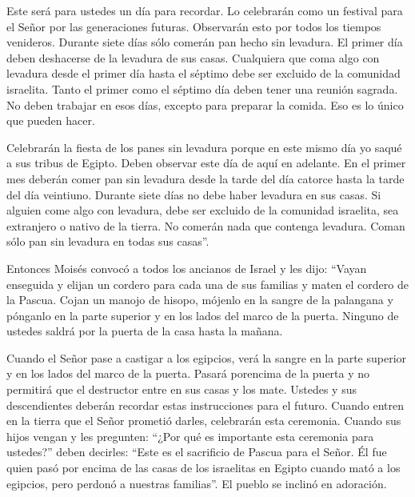  Este será para ustedes un día para recordar. Lo celebrarán
como un festival para el Señor por las generaciones futuras. Observarán
esto por todos los tiempos venideros.  Durante siete días
sólo comerán pan hecho sin levadura. El primer día deben deshacerse de
la levadura de sus casas. Cualquiera que coma algo con levadura desde el
primer día hasta el séptimo debe ser excluido de la comunidad israelita.
 Tanto el primer como el séptimo día deben tener una
reunión sagrada. No deben trabajar en esos días, excepto para preparar
la comida. Eso es lo único que pueden hacer.

 Celebrarán la fiesta de los panes sin levadura porque en
este mismo día yo saqué a sus tribus de Egipto. Deben observar este día
de aquí en adelante.  En el primer mes deberán comer pan
sin levadura desde la tarde del día catorce hasta la tarde del día
veintiuno.  Durante siete días no debe haber levadura en
sus casas. Si alguien come algo con levadura, debe ser excluido de la
comunidad israelita, sea extranjero o nativo de la tierra. 
No comerán nada que contenga levadura. Coman sólo pan sin levadura en
todas sus casas''.

 Entonces Moisés convocó a todos los ancianos de Israel y
les dijo: ``Vayan enseguida y elijan un cordero para cada una de sus
familias y maten el cordero de la Pascua.  Cojan un manojo
de hisopo, mójenlo en la sangre de la palangana y pónganlo en la parte
superior y en los lados del marco de la puerta. Ninguno de ustedes
saldrá por la puerta de la casa hasta la mañana.

 Cuando el Señor pase a castigar a los egipcios, verá la
sangre en la parte superior y en los lados del marco de la puerta.
Pasará porencima de la puerta y no permitirá que el destructor entre en
sus casas y los mate.  Ustedes y sus descendientes deberán
recordar estas instrucciones para el futuro.  Cuando entren
en la tierra que el Señor prometió darles, celebrarán esta ceremonia.
 Cuando sus hijos vengan y les pregunten: ``¿Por qué es
importante esta ceremonia para ustedes?''  deben decirles:
``Este es el sacrificio de Pascua para el Señor. Él fue quien pasó por
encima de las casas de los israelitas en Egipto cuando mató a los
egipcios, pero perdonó a nuestras familias''. El pueblo se inclinó en
adoración.

